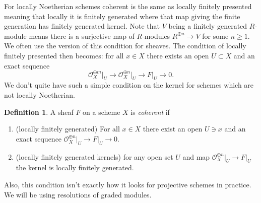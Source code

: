 \documentclass[12pt]{article}
\numberwithin{equation}{section}
\theoremstyle{definition}
\newtheorem{definition}[theorem]{Definition}
\theoremstyle{remark}
\newcommand{\Ocal}{\mathcal{O}}
\begin{document}
For locally Noetherian schemes coherent is the same as locally finitely presented meaning that locally it is finitely generated where that map giving the finite generation has finitely generated kernel.
Note that $V$ being a finitely generated $R$-module means there is a surjective map of $R$-modules $R^{\oplus n}\to V$ for some $n\geq 1$. 
We often use the version of this condition for sheaves. 
The condition of locally finitely presented then becomes: for all $x\in X$ there exists an open $U\subset X$ and an exact sequence 
 $$ \Ocal_X^{\oplus m}\vert_U \to \Ocal_X^{\oplus n}\vert_U \to F\vert_U \to 0. $$
We don't quite have such a simple condition on the kernel for schemes which are not locally Noetherian. 
\begin{definition}
A sheaf $F$ on a scheme $X$ is \emph{coherent} if 
\begin{enumerate}
	\item (locally finitely generated) For all $x\in X$ there exist an open $U\owns x$ and an exact sequence $\Ocal_X^{\oplus n}\vert_U \to F\vert_U \to 0$.
	\item (locally finitely generated kernels) for any open set $U$ and map $\Ocal_X^{\oplus n}\vert_U \to F\vert_U$ the kernel is locally finitely generated.
\end{enumerate}
\end{definition}
Also, this condition isn't exactly how it looks for projective schemes in practice.
We will be using resolutions of graded modules. 
\end{document}

